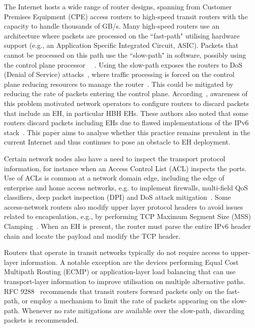 \documentclass[conference]{IEEEtran}
\begin{document}
The Internet hosts a wide range of router designs, spanning from Customer
Premises Equipment (CPE) access routers to high-speed transit routers with the
capacity to handle thousands of GB/s.  Many high-speed routers use an
architecture where packets are processed on the ``fast-path" utilising hardware
support (e.g., an Application Specific Integrated Circuit, ASIC). Packets that
cannot be processed on this path use the ``slow-path" in software, possibly
using the control plane processor~\cite{RFC3654} ~\cite{ietf-v6ops-hbh-03}.
Using the slow-path exposes the routers to DoS (Denial of Service)
attacks~\cite{naagas2021deh}, where traffic processing is forced on the control
plane reducing resources to manage the router~\cite{router-architecture}. This
could be mitigated  by reducing the rate of packets entering the control plane.
According~\cite{passive-threats}, awareness of this problem motivated network
operators to configure routers to discard packets that include an EH, in
particular HBH EHs. These authors also noted that some routers discard packets
including EHs due to flawed implementations of the IPv6
stack~\cite{passive-threats}.  This paper aims to analyse whether this practice
remains prevalent in the current Internet and thus continues to pose an
obstacle to EH deployment.

Certain network nodes also have a need to inspect the transport protocol
information, for instance when an Access Control List (ACL) inspects the ports.
Use of ACLs is common at a network domain edge, including the edge of enterprise
and home access networks, e.g. to implement firewalls, multi-field QoS
classifiers, deep packet inspection (DPI) and DoS attack
mitigation~\cite{lb-classification}. Some access-network routers also modify
upper layer protocol headers to avoid issues related to encapsulation, e.g.,
by performing TCP Maximum Segment Size (MSS) Clamping~\cite{custura-mtu}. When
an EH is present, the router must parse the entire IPv6 header
chain and locate the payload and modify the TCP header. 

Routers that operate in transit networks typically do not require access to
upper-layer information. A notable exception are the devices performing Equal
Cost Multipath Routing (ECMP) or application-layer load balancing that can use
transport-layer information to improve utilisation on multiple alternative
paths. RFC 9288~\cite{rfc9288} recommends that transit routers forward packets
only on the fast-path, or employ a mechanism to limit the rate of packets
appearing on the slow-path.  Whenever no rate mitigations are available over
the slow-path, discarding packets is recommended. 
\end{document}
